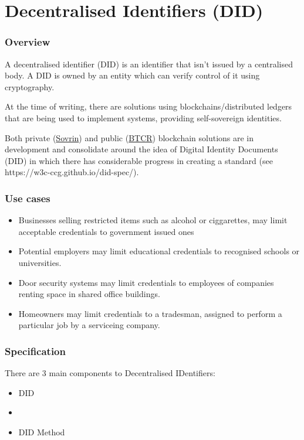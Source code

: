 \documentclass[10pt,a4paper]{runcrypto}
\begin{document}
\part{Decentralised Identifiers (DID)}

\section{Overview}
A decentralised identifier (DID) is an identifier that isn't issued by a centralised body.  A DID is owned by an entity which can verify control of it using cryptography.

At the time of writing, there are solutions using blockchains/distributed ledgers that are being used to implement systems, providing self-sovereign identities.

Both private (\href{https://sovrin.org/}{Sovrin}) and public (\href{https://w3c-ccg.github.io/didm-btcr/}{BTCR}) blockchain solutions are in development and consolidate around the idea of Digital Identity Documents (DID) in which there has considerable progress in creating a standard (see https://w3c-ccg.github.io/did-spec/).

\section{Use cases}
\begin{itemize}
	\item Businesses selling restricted items such as alcohol or ciggarettes, may limit acceptable credentials to government issued ones
    \item Potential employers may limit educational credentials to recognised schools or universities.
    \item Door security systems may limit credentials to employees of companies renting space in shared office buildings.
    \item Homeowners may limit credentials to a tradesman, assigned to perform a particular job by a serviceing company.
\end{itemize}

\section{Specification}

There are 3 main components to Decentralised IDentifiers:
\begin{itemize}
	\item DID
	\item \diddoc
	\item DID Method
\end{itemize}
\end{document}

